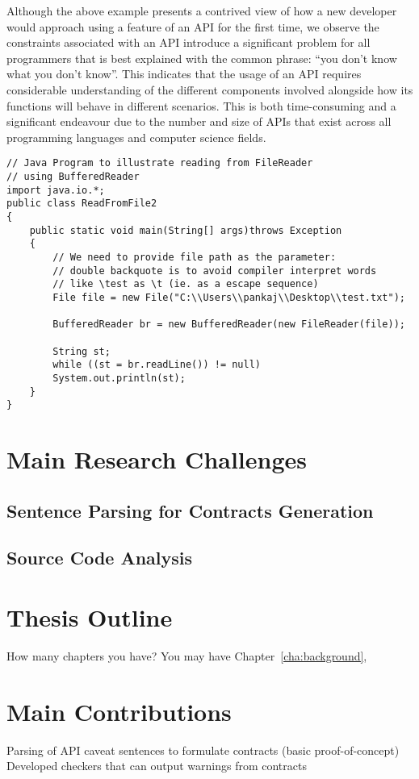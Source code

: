 Although the above example presents a contrived view of how a new developer would approach using a feature of an API for the first time, we observe the constraints associated with an API introduce a significant problem for all programmers that is best explained with the common phrase: ``you don't know what you don't know''. This indicates that the usage of an API requires considerable understanding of the different components involved alongside how its functions will behave in different scenarios. This is both time-consuming and a significant endeavour due to the number and size of APIs that exist across all programming languages and computer science fields.

\begin{lstlisting}[tabsize=4,caption={File reading java code example from GeeksforGeeks},label={lst:code-example}]
// Java Program to illustrate reading from FileReader 
// using BufferedReader 
import java.io.*; 
public class ReadFromFile2 
{ 
	public static void main(String[] args)throws Exception 
	{ 
		// We need to provide file path as the parameter: 
		// double backquote is to avoid compiler interpret words 
		// like \test as \t (ie. as a escape sequence) 
		File file = new File("C:\\Users\\pankaj\\Desktop\\test.txt"); 
		
		BufferedReader br = new BufferedReader(new FileReader(file)); 
		
		String st; 
		while ((st = br.readLine()) != null) 
		System.out.println(st); 
	} 
} 
\end{lstlisting}

\section{Main Research Challenges}
\label{sec:mainresearchchallenges}

\subsection{Sentence Parsing for Contracts Generation}

\subsection{Source Code Analysis}

\section{Thesis Outline}
\label{sec:outline}
How many chapters you have? You may have Chapter~\ref{cha:background},

\section{Main Contributions}
Parsing of API caveat sentences to formulate contracts (basic proof-of-concept)
Developed checkers that can output warnings from contracts

